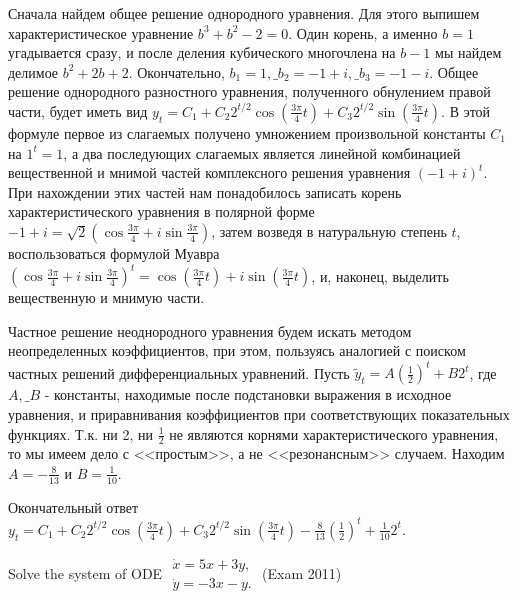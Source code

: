 \begin{solution}
Сначала найдем общее решение однородного уравнения. Для этого выпишем характеристическое уравнение $b^{3} +b^{2} -2=0$. Один корень, а именно $b=1$ угадывается сразу, и после деления кубического многочлена на $b-1$ мы найдем делимое $b^{2} +2b+2$. Окончательно, $b_{1} =1,\_ b_{2} =-1+i,\_ b_{3} =-1-i$. Общее решение однородного разностного уравнения, полученного обнулением правой части, будет иметь вид $y_{t} =C_{1} +C_{2} 2^{t/2} \cos (\frac{3\pi }{4} t)+C_{3} 2^{t/2} \sin (\frac{3\pi }{4} t)$. В этой формуле первое из слагаемых получено умножением произвольной константы $C_{1} $ на $1^{t} =1$, а два последующих слагаемых является линейной комбинацией вещественной и мнимой частей комплексного решения уравнения $(-1+i)^{t} $. При нахождении этих частей нам понадобилось записать корень характеристического уравнения в полярной форме $-1+i=\sqrt{2} (\cos \frac{3\pi }{4} +i\sin \frac{3\pi }{4} )$, затем возведя в натуральную степень $t$, воспользоваться формулой Муавра $(\cos \frac{3\pi }{4} +i\sin \frac{3\pi }{4} )^{t} =\cos (\frac{3\pi }{4} t)+i\sin (\frac{3\pi }{4} t)$, и, наконец, выделить вещественную и мнимую части.

Частное решение неоднородного уравнения будем искать методом неопределенных коэффициентов, при этом, пользуясь аналогией с поиском частных решений дифференциальных уравнений. Пусть $\tilde{y}_{t} =A(\frac{1}{2} )^{t} +B2^{t} $, где $A,\_ B$ - константы, находимые после подстановки выражения в исходное уравнения, и приравнивания коэффициентов при соответствующих показательных функциях. Т.к. ни 2, ни $\frac{1}{2} $ не являются корнями характеристического уравнения, то мы имеем дело с <<простым>>, а не <<резонансным>> случаем. Находим $A=-\frac{8}{13} $ и $B=\frac{1}{10} $.

Окончательный ответ $y_{t} =C_{1} +C_{2} 2^{t/2} \cos (\frac{3\pi }{4} t)+C_{3} 2^{t/2} \sin (\frac{3\pi }{4} t)-\frac{8}{13} (\frac{1}{2} )^{t} +\frac{1}{10} 2^{t} $.
\end{solution}


\begin{problem}
Solve the system of ODE  $\begin{array}{c} {\dot{x}=5x+3y,} \\ {\dot{y}=-3x-y.} \end{array}$ (Exam 2011)
\end{problem}

